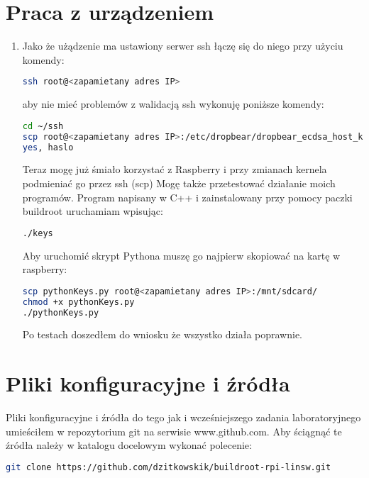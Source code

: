 \section{Praca z urządzeniem}
\begin{enumerate}
\item Jako że użądzenie ma ustawiony serwer ssh łączę się do niego przy użyciu komendy:
\begin{lstlisting}[language=bash]
ssh root@<zapamietany adres IP>
\end{lstlisting}
aby nie mieć problemów z walidacją ssh wykonuję poniższe komendy:
\begin{lstlisting}[language=bash]
cd ~/ssh
scp root@<zapamietany adres IP>:/etc/dropbear/dropbear_ecdsa_host_key ./
yes, haslo
\end{lstlisting}
Teraz mogę już śmiało korzystać z Raspberry i przy zmianach kernela podmieniać go przez ssh (scp)
Mogę także przetestować działanie moich programów. Program napisany w C++ i zainstalowany przy pomocy
paczki buildroot uruchamiam wpisując:
\begin{lstlisting}[language=bash]
./keys
\end{lstlisting}
Aby uruchomić skrypt Pythona muszę go najpierw skopiować na kartę w raspberry:
\begin{lstlisting}[language=bash]
scp pythonKeys.py root@<zapamietany adres IP>:/mnt/sdcard/
chmod +x pythonKeys.py
./pythonKeys.py
\end{lstlisting}
Po testach doszedłem do wniosku że wszystko działa poprawnie.
\end{enumerate}

\section{Pliki konfiguracyjne i źródła}
Pliki konfiguracyjne i źródła do tego jak i wcześniejszego zadania laboratoryjnego umieściłem w repozytorium
git na serwisie www.github.com. Aby ściągnąć te źródła należy w katalogu docelowym wykonać polecenie:
\begin{lstlisting}[language=bash]
git clone https://github.com/dzitkowskik/buildroot-rpi-linsw.git
\end{lstlisting}	

